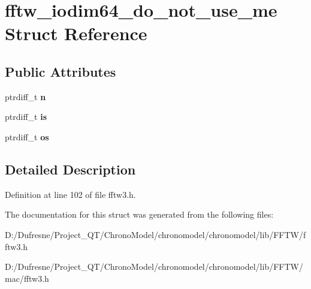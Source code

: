 \hypertarget{structfftw__iodim64__do__not__use__me}{\section{fftw\-\_\-iodim64\-\_\-do\-\_\-not\-\_\-use\-\_\-me Struct Reference}
\label{structfftw__iodim64__do__not__use__me}
}
\subsection*{Public Attributes}
\begin{DoxyCompactItemize}
\item 
\hypertarget{structfftw__iodim64__do__not__use__me_a19f8739d839b44db63c3aa1696a3a038}{ptrdiff\-\_\-t {\bfseries n}}\label{structfftw__iodim64__do__not__use__me_a19f8739d839b44db63c3aa1696a3a038}

\item 
\hypertarget{structfftw__iodim64__do__not__use__me_a1b9164674e2d091e8bde88c8d1bb7b6e}{ptrdiff\-\_\-t {\bfseries is}}\label{structfftw__iodim64__do__not__use__me_a1b9164674e2d091e8bde88c8d1bb7b6e}

\item 
\hypertarget{structfftw__iodim64__do__not__use__me_a44118d774124bdaa670f640537b151cf}{ptrdiff\-\_\-t {\bfseries os}}\label{structfftw__iodim64__do__not__use__me_a44118d774124bdaa670f640537b151cf}

\end{DoxyCompactItemize}


\subsection{Detailed Description}


Definition at line 102 of file fftw3.\-h.



The documentation for this struct was generated from the following files\-:\begin{DoxyCompactItemize}
\item 
D\-:/\-Dufresne/\-Project\-\_\-\-Q\-T/\-Chrono\-Model/chronomodel/chronomodel/lib/\-F\-F\-T\-W/fftw3.\-h\item 
D\-:/\-Dufresne/\-Project\-\_\-\-Q\-T/\-Chrono\-Model/chronomodel/chronomodel/lib/\-F\-F\-T\-W/mac/fftw3.\-h\end{DoxyCompactItemize}

